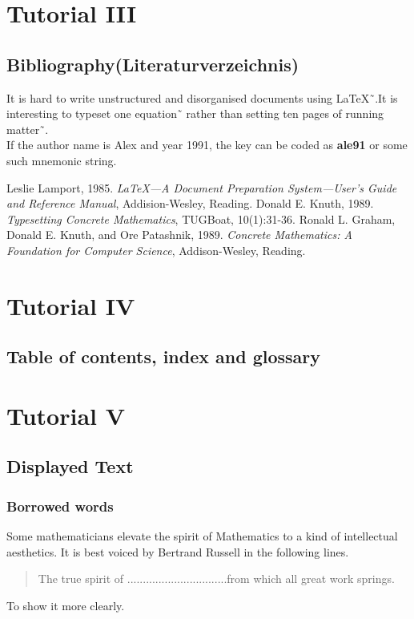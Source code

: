 \documentclass{article}
\theoremstyle{definition}
\theoremstyle{remark}
\theoremstyle{plain}
\numberwithin{equation}{subsection}
\begin{document}
\section{Tutorial III}
\subsection{Bibliography(Literaturverzeichnis)}
It is hard to write unstructured and disorganised documents using
\LaTeX˜\cite{les85}.It is interesting to typeset one
equation˜\cite[Sec 3.3]{les85} rather than setting ten pages of
running matter˜\cite{don89,rondon89}.\\If the author name is Alex and year 1991, the key can be coded as \textbf{\large{ale91}} or some
such mnemonic string.
\begin{thebibliography}{9}
	Leslie Lamport, 1985. \emph{\LaTeX---A Document
		Preparation System---User’s Guide and Reference Manual},
	Addision-Wesley, Reading.
	Donald E. Knuth, 1989. \emph{Typesetting Concrete
		Mathematics}, TUGBoat, 10(1):31-36.
	Ronald L. Graham, Donald E. Knuth, and Ore
	Patashnik, 1989. \emph{Concrete Mathematics: A Foundation for
		Computer Science}, Addison-Wesley, Reading.
\end{thebibliography}

\section{Tutorial IV}
\subsection{Table of contents, index and glossary}

\section{Tutorial V}
\subsection{Displayed Text}
\subsubsection{Borrowed words}
Some mathematicians elevate the spirit of Mathematics to a kind of
intellectual aesthetics. It is best voiced by Bertrand Russell in the
following lines.
\begin{quote}
	The true spirit of ................................from which
	all great work springs.
\end{quote}
To show it more clearly.
\end{document}
